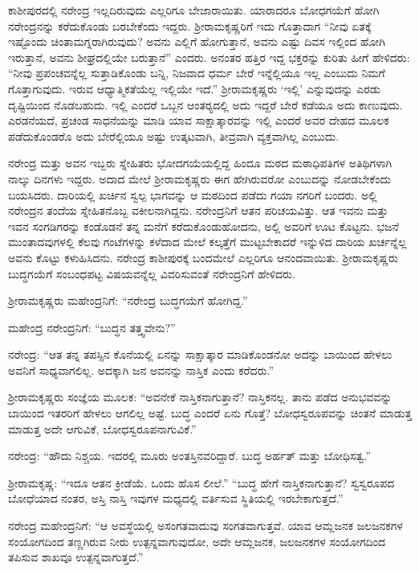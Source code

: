 ಕಾಶೀಪುರದಲ್ಲಿ ನರೇಂದ್ರ ಇಲ್ಲದಿರುವುದು ಎಲ್ಲರಿಗೂ ಬೇಜಾರಾಯಿತು. ಯಾರಾದರೂ ಬೋಧಗಯೆಗೆ ಹೋಗಿ ನರೇಂದ್ರನನ್ನು ಕರೆದುಕೊಂಡು ಬರಬೇಕೆಂದು ಇದ್ದರು. ಶ‍್ರೀರಾಮಕೃಷ್ಣರಿಗೆ ಇದು ಗೊತ್ತಾದಾಗ “ನೀವು ಏತಕ್ಕೆ ಇಷ್ಟೊಂದು ಚಿಂತಾಮಗ್ನರಾಗಿರುವುದು? ಅವನು ಎಲ್ಲಿಗೆ ಹೋಗುತ್ತಾನೆ, ಅವನು ಎಷ್ಟು ದಿವಸ ಇಲ್ಲಿಂದ ಹೋಗಿ ಇರುತ್ತಾನೆ, ಅವನು ಶೀಘ್ರದಲ್ಲಿಯೇ ಬರುತ್ತಾನೆ” ಎಂದರು. ಅನಂತರ ಹತ್ತಿರ ಇದ್ದ ಭಕ್ತರನ್ನು ಕುರಿತು ಹೀಗೆ ಹೇಳಿದರು: “ನೀವು ಪ್ರಪಂಚವನ್ನೆಲ್ಲ ಸುತ್ತಾಡಿಕೊಂಡು ಬನ್ನಿ, ನಿಜವಾದ ಧರ್ಮ ಬೇರೆ ಇನ್ನೆಲ್ಲಿಯೂ ಇಲ್ಲ ಎಂಬುದು ನಿಮಗೆ ಗೊತ್ತಾಗುವುದು. ಇರುವ ಆಧ್ಯಾತ್ಮಿಕತೆಯೆಲ್ಲ ಇಲ್ಲಿಯೇ ಇದೆ.” ಶ‍್ರೀರಾಮಕೃಷ್ಣರು ‘ಇಲ್ಲಿ’ ಎನ್ನುವುದನ್ನು ಎರಡು ದೃಷ್ಟಿಯಿಂದ ನೊಡಬಹುದು. ಇಲ್ಲಿ ಎಂದರೆ ಒಬ್ಬನ ಆಂತರ‍್ಯದಲ್ಲಿ ಅದು ಇದ್ದರೆ ಬೇರೆ ಕಡೆಯೂ ಅದು ಕಾಣುವುದು. ಎರಡನೆಯದೆ, ಪ್ರಚಂಡ ಸಾಧನೆಯನ್ನು ಮಾಡಿ ಯಾವ ಸಾಕ್ಷಾತ್ಕಾರವನ್ನು ಇಲ್ಲಿ ಎಂದರೆ ಅವರ ದೇಹದ ಮೂಲಕ ಪಡೆದುಕೊಂಡರೊ ಅದು ಬೇರೆಲ್ಲಿಯೂ ಅಷ್ಟು ಉತ್ಕಟವಾಗಿ, ತೀವ್ರವಾಗಿ ವ್ಯಕ್ತವಾಗಿಲ್ಲ ಎಂಬುದು.

ನರೇಂದ್ರ ಮತ್ತು ಅವನ ಇಬ್ಬರು ಸ್ನೇಹಿತರು ಭೋದಗಯೆಯಲ್ಲಿದ್ದ ಹಿಂದೂ ಮಠದ ಮಠಾಧಿಪತಿಗಳ ಅತಿಥಿಗಳಾಗಿ ನಾಲ್ಕು ದಿನಗಳು ಇದ್ದರು. ಅದಾದ ಮೇಲೆ ಶ‍್ರೀರಾಮಕೃಷ್ಣರು ಈಗ ಹೇಗಿರುವರೋ ಎಂಬುದನ್ನು ನೋಡಬೇಕೆಂದು ಬಯಸಿದರು. ದಾರಿಯಲ್ಲಿ ಖರ್ಚಿನ ಸ್ವಲ್ಪ ಭಾಗವನ್ನು ಆ ಮಠದಿಂದ ಪಡೆದು ಗಯಾ ನಗರಿಗೆ ಬಂದರು. ಅಲ್ಲಿ ನರೇಂದ್ರನ ತಂದೆಯ ಸ್ನೇಹಿತನೊಬ್ಬ ವಕೀಲನಾಗಿದ್ದನು. ನರೇಂದ್ರನಿಗೆ ಆತನ ಪರಿಚಯವಿತ್ತು. ಆತ ಇವನು ಮತ್ತು ಇವನ ಸಂಗಡಿಗರನ್ನು ಕಂಡೊಡನೆ ತನ್ನ ಮನೆಗೆ ಕರೆದುಕೊಂಡುಹೋದನು, ಅಲ್ಲಿ ಅವರಿಗೆ ಊಟ ಕೊಟ್ಟನು. ಭಜನೆ ಮುಂತಾದವುಗಳಲ್ಲಿ ಕೆಲವು ಗಂಟೆಗಳನ್ನು ಕಳೆದಾದ ಮೇಲೆ ಕಲ್ಕತ್ತೆಗೆ ಮುಟ್ಟಬೇಕಾದರೆ ಇನ್ನುಳಿದ ದಾರಿಯ ಖರ್ಚನ್ನೆಲ್ಲ ಅವನು ಕೊಟ್ಟು ಕಳುಹಿಸಿದನು. ನರೇಂದ್ರ ಕಾಶೀಪುರಕ್ಕೆ ಬಂದಮೇಲೆ ಎಲ್ಲರಿಗೂ ಆನಂದವಾಯಿತು. ಶ‍್ರೀರಾಮಕೃಷ್ಣರು ಬುದ್ಧಗಯೆಗೆ ಸಂಬಂಧಪಟ್ಟ ವಿಷಯವನ್ನೆಲ್ಲ ವಿವರಿಸುವಂತೆ ನರೇಂದ್ರನಿಗೆ ಹೇಳಿದರು.

ಶ‍್ರೀರಾಮಕೃಷ್ಣರು ಮಹೇಂದ್ರನಿಗೆ: “ನರೇಂದ್ರ ಬುದ್ಧಗಯೆಗೆ ಹೋಗಿದ್ದ.”

ಮಹೇಂದ್ರ ನರೇಂದ್ರನಿಗೆ: “ಬುದ್ಧನ ತತ್ತ್ವವೇನು?”

ನರೇಂದ್ರ: “ಆತ ತನ್ನ ತಪಸ್ಸಿನ ಕೊನೆಯಲ್ಲಿ ಏನನ್ನು ಸಾಕ್ಷಾತ್ಕಾರ ಮಾಡಿಕೊಂಡನೋ ಅದನ್ನು ಬಾಯಿಂದ ಹೇಳಲು ಅವನಿಗೆ ಸಾಧ್ಯವಾಗಲಿಲ್ಲ. ಅದಕ್ಕಾಗಿ ಜನ ಅವನನ್ನು ನಾಸ್ತಿಕ ಎಂದು ಕರೆದರು.”

ಶ‍್ರೀರಾಮಕೃಷ್ಣರು ಸಂಜ್ಞೆಯ ಮೂಲಕ: “ಅವನೇಕೆ ನಾಸ್ತಿಕನಾಗುತ್ತಾನೆ? ನಾಸ್ತಿಕನಲ್ಲ. ತಾನು ಪಡೆದ ಅನುಭವವನ್ನು ಬಾಯಿಂದ ಇತರರಿಗೆ ಹೇಳಲು ಆಗಲಿಲ್ಲ ಅಷ್ಟೆ. ಬುದ್ಧ ಎಂದರೆ ಏನು ಗೊತ್ತೆ? ಬೋಧಸ್ವರೂಪವನ್ನು ಚಿಂತನೆ ಮಾಡುತ್ತ ಮಾಡುತ್ತ ಅದೇ ಆಗುವಿಕೆ, ಬೋಧಸ್ವರೂಪನಾಗುವಿಕೆ.”

ನರೇಂದ್ರ: “ಹೌದು ನಿಶ್ಚಯ. ಇದರಲ್ಲಿ ಮೂರು ಅಂತಸ್ತಿನವರಿದ್ದಾರೆ. ಬುದ್ಧ ಅರ್ಹತ್ ಮತ್ತು ಬೋಧಿಸತ್ವ.”

ಶ‍್ರೀರಾಮಕೃಷ್ಣ: “ಇದೂ ಆತನ ಕ್ರೀಡೆಯೆ. ಒಂದು ಹೊಸ ಲೀಲೆ.” “ಬುದ್ಧ ಹೇಗೆ ನಾಸ್ತಿಕನಾಗುತ್ತಾನೆ? ಸ್ವಸ್ವರೂಪದ ಬೋಧೆಯಾದ ನಂತರ, ಅಸ್ತಿ ನಾಸ್ತಿ ಇವುಗಳ ಮಧ್ಯದಲ್ಲಿ ವರ್ತಿಸುವ ಸ್ಥಿತಿಯಲ್ಲಿ ಇರಬೇಕಾಗುತ್ತದೆ.”

ನರೇಂದ್ರ ಮಹೇಂದ್ರನಿಗೆ: “ಆ ಅವಸ್ಥೆಯಲ್ಲಿ ಅಸಂಗತವಾದುವು ಸಂಗತವಾಗುತ್ತವೆ. ಯಾವ ಆಮ್ಲಜನಕ ಜಲಜನಕಗಳ ಸಂಯೋಗದಿಂದ ತಣ್ಣಗಿರುವ ನೀರು ಉತ್ಪನ್ನವಾಗುವುದೋ, ಅದೇ ಆಮ್ಲಜನಕ, ಜಲಜನಕಗಳ ಸಂಯೋಗದಿಂದ ತಪಿಸುವ ಶಾಖವೂ ಉತ್ಪನ್ನವಾಗುತ್ತದೆ.”

